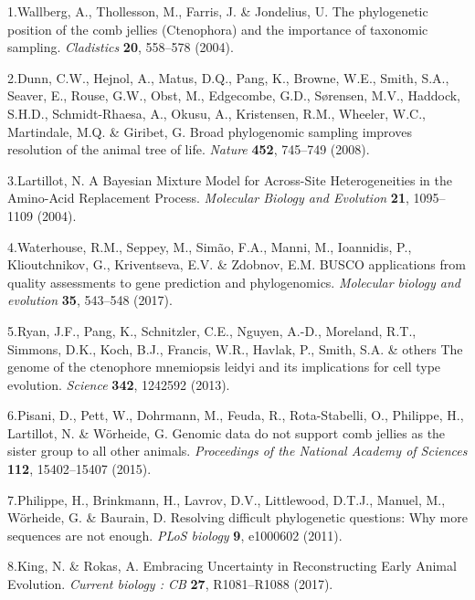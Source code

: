 \documentclass[]{article}
\begin{document}
\hypertarget{refs}{}
\leavevmode\hypertarget{ref-Wallberg:2004ws}{}%
1.Wallberg, A., Thollesson, M., Farris, J. \& Jondelius, U. The
phylogenetic position of the comb jellies (Ctenophora) and the
importance of taxonomic sampling. \emph{Cladistics} \textbf{20},
558--578 (2004).

\leavevmode\hypertarget{ref-Dunn:2008ky}{}%
2.Dunn, C.W., Hejnol, A., Matus, D.Q., Pang, K., Browne, W.E., Smith,
S.A., Seaver, E., Rouse, G.W., Obst, M., Edgecombe, G.D., Sørensen,
M.V., Haddock, S.H.D., Schmidt-Rhaesa, A., Okusu, A., Kristensen, R.M.,
Wheeler, W.C., Martindale, M.Q. \& Giribet, G. Broad phylogenomic
sampling improves resolution of the animal tree of life. \emph{Nature}
\textbf{452}, 745--749 (2008).

\leavevmode\hypertarget{ref-Lartillot:2004dq}{}%
3.Lartillot, N. A Bayesian Mixture Model for Across-Site Heterogeneities
in the Amino-Acid Replacement Process. \emph{Molecular Biology and
Evolution} \textbf{21}, 1095--1109 (2004).

\leavevmode\hypertarget{ref-waterhouse2017busco}{}%
4.Waterhouse, R.M., Seppey, M., Simão, F.A., Manni, M., Ioannidis, P.,
Klioutchnikov, G., Kriventseva, E.V. \& Zdobnov, E.M. BUSCO applications
from quality assessments to gene prediction and phylogenomics.
\emph{Molecular biology and evolution} \textbf{35}, 543--548 (2017).

\leavevmode\hypertarget{ref-ryan2013genome}{}%
5.Ryan, J.F., Pang, K., Schnitzler, C.E., Nguyen, A.-D., Moreland, R.T.,
Simmons, D.K., Koch, B.J., Francis, W.R., Havlak, P., Smith, S.A. \&
others The genome of the ctenophore mnemiopsis leidyi and its
implications for cell type evolution. \emph{Science} \textbf{342},
1242592 (2013).

\leavevmode\hypertarget{ref-pisani2015genomic}{}%
6.Pisani, D., Pett, W., Dohrmann, M., Feuda, R., Rota-Stabelli, O.,
Philippe, H., Lartillot, N. \& Wörheide, G. Genomic data do not support
comb jellies as the sister group to all other animals. \emph{Proceedings
of the National Academy of Sciences} \textbf{112}, 15402--15407 (2015).

\leavevmode\hypertarget{ref-philippe2011resolving}{}%
7.Philippe, H., Brinkmann, H., Lavrov, D.V., Littlewood, D.T.J., Manuel,
M., Wörheide, G. \& Baurain, D. Resolving difficult phylogenetic
questions: Why more sequences are not enough. \emph{PLoS biology}
\textbf{9}, e1000602 (2011).

\leavevmode\hypertarget{ref-King:2017ie}{}%
8.King, N. \& Rokas, A. Embracing Uncertainty in Reconstructing Early
Animal Evolution. \emph{Current biology : CB} \textbf{27}, R1081--R1088
(2017).
\end{document}
